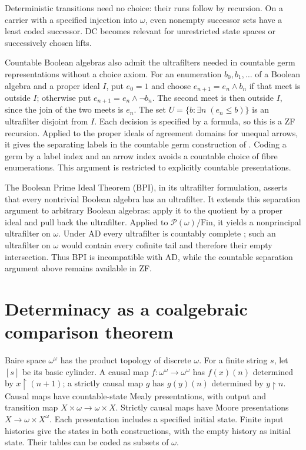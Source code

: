 \documentclass[11pt]{article}
\theoremstyle{definition}
\newcommand{\N}{\omega}
\newcommand{\B}{\omega^\omega}
\begin{document}
Deterministic transitions need no choice: their runs follow by
recursion. On a carrier with a specified injection into $\N$, even
nonempty successor sets have a least coded successor. DC becomes
relevant for unrestricted state spaces or successively chosen lifts.

Countable Boolean algebras also admit the ultrafilters needed in
countable germ representations without a choice axiom. For an
enumeration $b_0,b_1,\ldots$ of a Boolean algebra and a proper ideal
$I$, put $e_0=1$ and choose $e_{n+1}=e_n\wedge b_n$ if that
meet is outside $I$; otherwise put
$e_{n+1}=e_n\wedge\neg b_n$. The second meet is then outside
$I$, since the join of the two meets is $e_n$. The set
$U=\{b:\exists n\;(e_n\leq b)\}$ is an ultrafilter disjoint
from $I$. Each decision is specified by a formula, so this is a
ZF recursion. Applied to the proper ideals of agreement domains
for unequal arrows, it gives the separating labels in the countable
germ construction of \cite[Section 4]{Catalogue}. Coding a germ by
a label index and an arrow index avoids a countable choice of fibre
enumerations. This argument is restricted to explicitly countable
presentations.

The Boolean Prime Ideal Theorem (BPI), in its ultrafilter formulation,
asserts that every nontrivial Boolean algebra has an ultrafilter.
It extends this separation argument to arbitrary Boolean algebras:
apply it to the quotient by a proper ideal and pull back the
ultrafilter. Applied to $\mathcal P(\N)/\mathrm{Fin}$, it yields
a nonprincipal ultrafilter on $\N$. Under AD every ultrafilter is
countably complete \cite[Theorem 2.8]{KoellnerWoodin}; such an
ultrafilter on $\N$ would contain every cofinite tail and therefore
their empty intersection. Thus BPI is incompatible with AD, while
the countable separation argument above remains available in ZF.

\section{Determinacy as a coalgebraic comparison theorem}\label{sec:games}

Baire space $\B$ has the product topology of discrete $\N$.
For a finite string $s$, let $[s]$ be its basic cylinder. A causal
map $f:\B\to\B$ has $f(x)(n)$ determined by
$x\upharpoonright(n+1)$; a strictly causal map $g$ has
$g(y)(n)$ determined by $y\upharpoonright n$.
Causal maps have countable-state Mealy presentations, with output
and transition map $X\times\N\to\N\times X$. Strictly causal
maps have Moore presentations $X\to\N\times X^\N$.
Each presentation includes a specified initial state. Finite input
histories give the states in both constructions, with the empty
history as initial state.
Their tables can be coded as subsets of $\N$.
\end{document}
